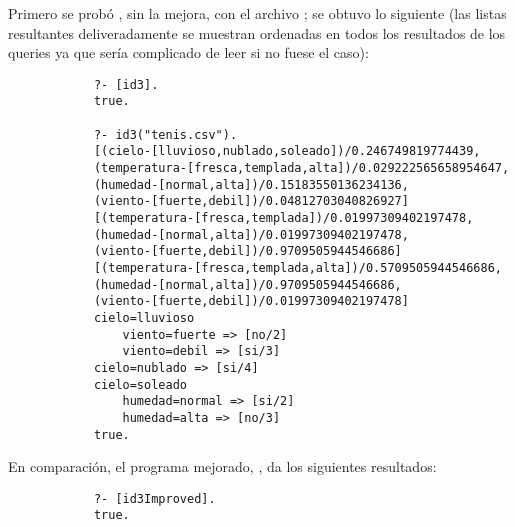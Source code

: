 \begin{enumerate}
\begin{solution}
        Primero se probó , sin la mejora, con el archivo ; se obtuvo lo siguiente (las listas resultantes deliveradamente se muestran ordenadas en todos los resultados de los queries ya que sería complicado de leer si no fuese el caso):
        \begin{verbatim}
            ?- [id3].
            true.

            ?- id3("tenis.csv").
            [(cielo-[lluvioso,nublado,soleado])/0.246749819774439,
            (temperatura-[fresca,templada,alta])/0.029222565658954647,
            (humedad-[normal,alta])/0.15183550136234136,
            (viento-[fuerte,debil])/0.04812703040826927]
            [(temperatura-[fresca,templada])/0.01997309402197478,
            (humedad-[normal,alta])/0.01997309402197478,
            (viento-[fuerte,debil])/0.9709505944546686]
            [(temperatura-[fresca,templada,alta])/0.5709505944546686,
            (humedad-[normal,alta])/0.9709505944546686,
            (viento-[fuerte,debil])/0.01997309402197478]
            cielo=lluvioso
                viento=fuerte => [no/2]
                viento=debil => [si/3]
            cielo=nublado => [si/4]
            cielo=soleado
                humedad=normal => [si/2]
                humedad=alta => [no/3]
            true.
        \end{verbatim}

        En comparación, el programa mejorado, , da los siguientes resultados:
        \begin{verbatim}
            ?- [id3Improved].
            true.


\end{verbatim}
\end{solution}
\end{enumerate}

